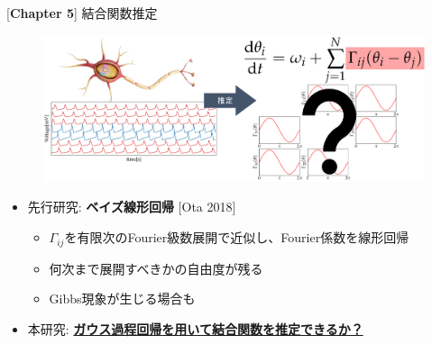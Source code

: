 
\begin{frame}{[\textbf{Chapter 5}] 結合関数推定}

\begin{figure}
  \centering
  \includegraphics[width=\textwidth]{figs/gp_coupling_ponchi.pdf}
\end{figure}

\begin{itemize}
  \item 先行研究: \textbf{ベイズ線形回帰} [Ota 2018]
  \begin{itemize}
    \item $\Gamma_{ij}$を有限次のFourier級数展開で近似し、Fourier係数を線形回帰
    \item 何次まで展開すべきかの自由度が残る
    \item Gibbs現象が生じる場合も
  \end{itemize}
  \item 本研究: \underline{\textbf{ガウス過程回帰を用いて結合関数を推定できるか？}}
\end{itemize}

\end{frame}

